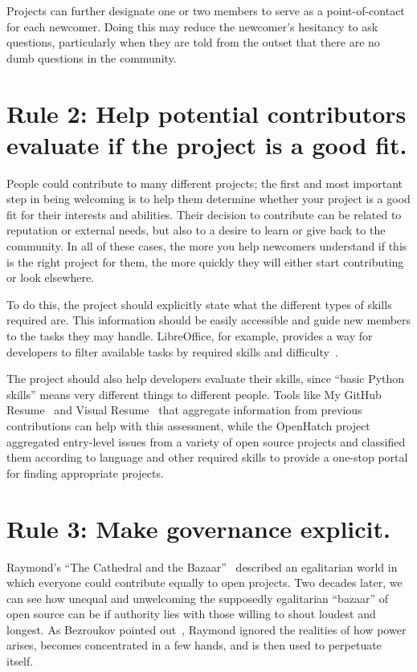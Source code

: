 \documentclass[10pt,letterpaper]{article}
\newcommand{\rulemajor}[1]{\section*{#1}}
\begin{document}
Projects can further designate one or two members to serve as a point-of-contact for each newcomer.
Doing this may reduce the newcomer's hesitancy to ask questions,
particularly when they are told from the outset that there are no dumb questions in the community.

\rulemajor{Rule 2: Help potential contributors evaluate if the project is a good fit.}

People could contribute to many different projects;
the first and most important step in being welcoming is to help them determine whether
your project is a good fit for their interests and abilities.
Their decision to contribute can be related to reputation or external needs,
but also to a desire to learn or give back to the community.
In all of these cases,
the more you help newcomers understand if this is the right project for them,
the more quickly they will either start contributing or look elsewhere.

To do this,
the project should explicitly state what the different types of skills required are.
This information should be easily accessible and guide new members to the tasks they may handle.
LibreOffice,
for example,
provides a way for developers to filter available tasks by required skills and difficulty~\cite{libreoffice-filtered}.

The project should also help developers evaluate their skills,
since ``basic Python skills'' means very different things to different people.
Tools like My GitHub Resume~\cite{my-github-resume} and Visual Resume~\cite{sarma2016}
that aggregate information from previous contributions can help with this assessment,
while the OpenHatch project~\cite{openhatch} aggregated entry-level issues from a variety of open source projects
and classified them according to language and other required skills
to provide a one-stop portal for finding appropriate projects.

\rulemajor{Rule 3: Make governance explicit.}

Raymond's ``The Cathedral and the Bazaar''~\cite{raymond2001}
described an egalitarian world in which everyone could contribute equally to open projects.
Two decades later,
we can see how unequal and unwelcoming the supposedly egalitarian ``bazaar'' of open source can be
if authority lies with those willing to shout loudest and longest.
As Bezroukov pointed out~\cite{bezroukov1999},
Raymond ignored the realities of how power arises,
becomes concentrated in a few hands,
and is then used to perpetuate itself.
\end{document}
